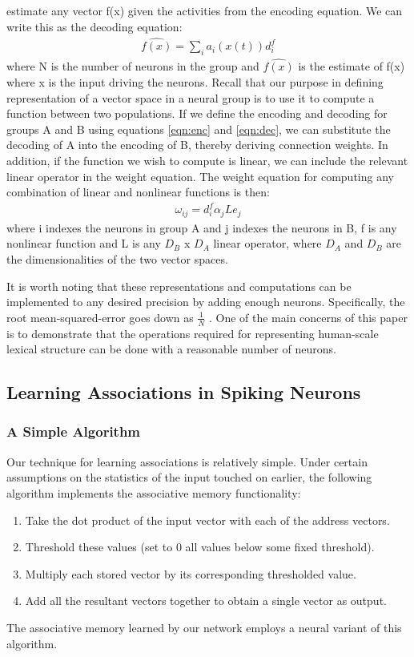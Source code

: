 \documentclass[10pt,letterpaper]{article}
\begin{document}
estimate any vector f(x) given the activities from the encoding equation. We can write
this as the decoding equation:
\begin{align}
\widehat{f(x)} = \sum_i a_i(x(t)) d^f_i \label{eqn:dec}
\end{align}
where N is the number of neurons in the group and $\widehat{f(x)}$ is the estimate of f(x) where x is the input driving the neurons. Recall that our purpose in defining representation of a vector space in a neural group
is to use it to compute a function between two populations. If we define the encoding
and decoding for groups A and B using equations \eqref{eqn:enc} and \eqref{eqn:dec}, we can substitute the
decoding of A into the encoding of B, thereby deriving connection weights. In addition, if the function we wish to compute is linear, we can include the relevant
linear operator in the weight equation. The weight equation for computing
any combination of linear and nonlinear functions is then:
\begin{align}
\omega_{ij} = d^f_i \alpha_j L e_j\label{eqn:weight}
\end{align}
where i indexes the neurons in group A and j indexes the neurons in B, f is any nonlinear function and L is any $D_B$ x $D_A$ linear operator, where $D_A$ and $D_B$ are the dimensionalities of the two vector spaces.

It is worth noting that these representations and computations can be implemented to any desired precision by adding enough neurons. Specifically, the root mean-squared-error goes down as $\frac{1}{N}$ \citep{Eliasmith2003m}. One of the main concerns of this paper is to demonstrate that the operations required for representing human-scale lexical structure can be done with a reasonable number of neurons.

\subsection{Learning Associations in Spiking Neurons}
\subsubsection{A Simple Algorithm}
Our technique for learning associations is relatively simple. Under certain assumptions on the statistics of the input touched on earlier, the following algorithm implements the associative memory functionality:
\begin{enumerate}
\item Take the dot product of the input vector with each of the address vectors.
\item Threshold these values (set to 0 all values below some fixed threshold).
\item Multiply each stored vector by its corresponding thresholded value.
\item Add all the resultant vectors together to obtain a single vector as output.
\end{enumerate}
The associative memory learned by our network employs a neural variant of this algorithm. 
\end{document}
